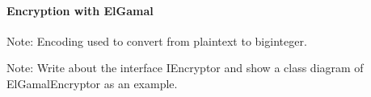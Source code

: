 \paragraph{Encryption with ElGamal}

Note: Encoding used to convert from plaintext to biginteger.

Note: Write about the interface IEncryptor and show a class diagram of ElGamalEncryptor as an example.